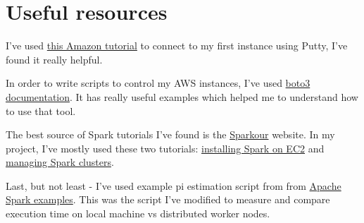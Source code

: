 \documentclass{article}
\begin{document}
\section{Useful resources}
I've used \href{https://docs.aws.amazon.com/AWSEC2/latest/UserGuide/putty.html}{this Amazon tutorial} to connect to my first instance using Putty, I've found it really helpful. \par
In order to write scripts to control my AWS instances, I've used \href{https://boto3.amazonaws.com/v1/documentation/api/latest/guide/ec2-example-managing-instances.html}{boto3 documentation}. It has really useful examples which helped me to understand how to use that tool. \par
The best source of Spark tutorials I've found is the \href{https://sparkour.urizone.net}{Sparkour} website. In my project, I've mostly used these two tutorials: \href{https://sparkour.urizone.net/recipes/installing-ec2/}{installing Spark on EC2} and \href{https://sparkour.urizone.net/recipes/managing-clusters}{managing Spark clusters}. \par
Last, but not least - I've used example pi estimation script from from \href{https://spark.apache.org/examples.html}{Apache Spark examples}. This was the script I've modified to measure and compare execution time on local machine vs distributed worker nodes. 
\end{document}
